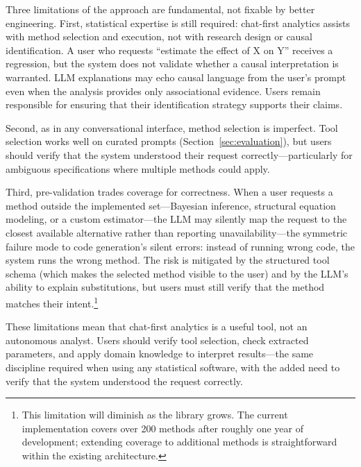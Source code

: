 Three limitations of the approach are fundamental, not fixable by
better engineering. First, statistical expertise is still required:
chat-first analytics assists with method selection and execution, not
with research design or causal identification. A user who requests
``estimate the effect of X on Y'' receives a regression, but the
system does not validate whether a causal interpretation is warranted.
LLM explanations may echo causal language from the user's prompt even
when the analysis provides only associational evidence. Users remain
responsible for ensuring that their identification strategy supports
their claims.

Second, as in any conversational interface, method selection is
imperfect. Tool selection works well on curated prompts
(Section~\ref{sec:evaluation}), but users should verify that the
system understood their request correctly---particularly for ambiguous
specifications where multiple methods could apply.

Third, pre-validation trades coverage for correctness. When a user
requests a method outside the implemented set---Bayesian inference,
structural equation modeling, or a custom estimator---the LLM may
silently map the request to the closest available alternative rather
than reporting unavailability---the symmetric failure mode to
code generation's silent errors: instead of running wrong code, the
system runs the wrong method. The risk is mitigated by the structured
tool schema (which makes the selected method visible to the user) and
by the LLM's ability to explain substitutions, but users must still
verify that the method matches their intent.\footnote{This limitation
will diminish as the library grows. The current implementation covers
over 200 methods after roughly one year of development; extending
coverage to additional methods is straightforward within the existing
architecture.}

These limitations mean that chat-first analytics is a useful tool,
not an autonomous analyst. Users should verify tool selection, check
extracted parameters, and apply domain knowledge to interpret
results---the same discipline required when using any statistical
software, with the added need to verify that the system understood the
request correctly.
